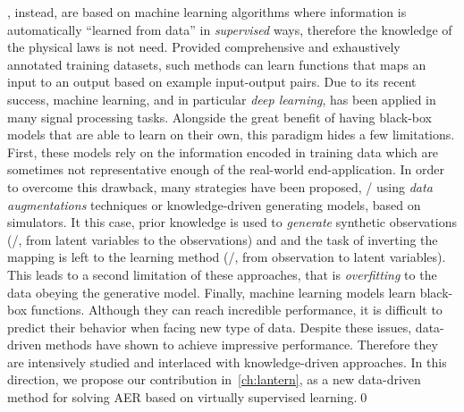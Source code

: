 , instead, are based on machine learning algorithms where information is automatically ``learned from data'' in \textit{supervised} ways, therefore the knowledge of the physical laws is not need.
Provided comprehensive and exhaustively annotated training datasets, such methods can learn functions that maps an input to an output based on example input-output pairs.
Due to its recent success, machine learning, and in particular \textit{deep learning}, has been applied in many signal processing tasks.
Alongside the great benefit of having black-box models that are able to learn on their own, this paradigm hides a few limitations.
\\First, these models rely on the information encoded in training data which are sometimes not representative enough of the real-world end-application.
In order to overcome this drawback, many strategies have been proposed, \eg/ using\textit{ data augmentations} techniques or knowledge-driven generating models, based on simulators.
It this case, prior knowledge is used to \textit{generate} synthetic observations (\ie/, from latent variables to the observations) and
and the task of inverting the mapping is left to the learning method (\ie/, from observation to latent variables).
This leads to a second limitation of these approaches, that is \textit{overfitting} to the data obeying the generative model.
Finally, machine learning models learn black-box functions.
Although they can reach incredible performance, it is difficult to predict their behavior when facing new type of data.
Despite these issues, data-driven methods have shown to achieve impressive performance.
Therefore they are intensively studied and interlaced with knowledge-driven approaches.
In this direction, we propose our contribution in~\cref{ch:lantern}, as a new data-driven method for solving \ac{AER} based on virtually supervised learning.\qed




